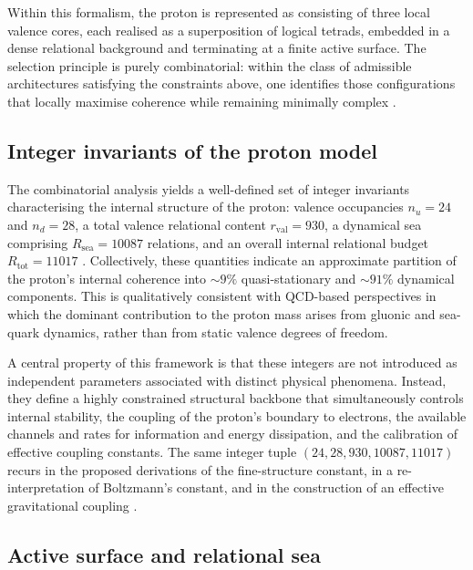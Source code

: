 \documentclass[11pt,a4paper]{article}
\begin{document}
Within this formalism, the proton is represented as consisting of three local valence cores, each realised as a superposition of logical tetrads, embedded in a dense relational background and terminating at a finite active surface. The selection principle is purely combinatorial: within the class of admissible architectures satisfying the constraints above, one identifies those configurations that locally maximise coherence while remaining minimally complex \citep{Combinatorial_Proton_v2_2026,PDL_intro}.

\subsection{Integer invariants of the proton model}
\label{subsec:proton_integers}

The combinatorial analysis yields a well-defined set of integer invariants characterising the internal structure of the proton: valence occupancies \(n_u = 24\) and \(n_d = 28\), a total valence relational content \(r_{\mathrm{val}} = 930\), a dynamical sea comprising \(R_{\mathrm{sea}} = 10087\) relations, and an overall internal relational budget \(R_{\mathrm{tot}} = 11017\) \citep{Combinatorial_Proton_v2_2026,PDL_intro}. Collectively, these quantities indicate an approximate partition of the proton’s internal coherence into \(\sim 9\%\) quasi-stationary and \(\sim 91\%\) dynamical components. This is qualitatively consistent with QCD-based perspectives in which the dominant contribution to the proton mass arises from gluonic and sea-quark dynamics, rather than from static valence degrees of freedom.

A central property of this framework is that these integers are not introduced as independent parameters associated with distinct physical phenomena. Instead, they define a highly constrained structural backbone that simultaneously controls internal stability, the coupling of the proton’s boundary to electrons, the available channels and rates for information and energy dissipation, and the calibration of effective coupling constants. The same integer tuple \((24,28,930,10087,11017)\) recurs in the proposed derivations of the fine-structure constant, in a re-interpretation of Boltzmann’s constant, and in the construction of an effective gravitational coupling \citep{PDL_intro,Alpha_PDL_v2_2026,Born_Golden_v2_2026}.

\subsection{Active surface and relational sea}
\label{subsec:active_surface}
\end{document}
